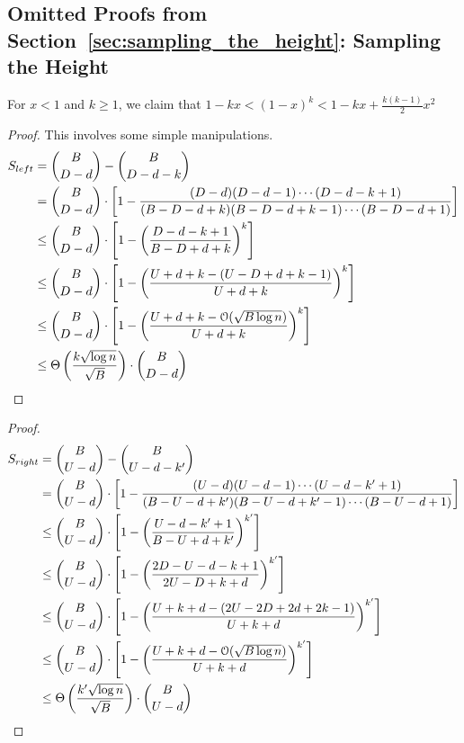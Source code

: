 \subsection{Omitted Proofs from Section~\ref{sec:sampling_the_height}: Sampling the Height}%
\label{sec:appendix_sampling_the_height}
\begin{lemma}
\label{lem:taylor_bound}
For $x < 1$ and $k\ge 1$, we claim that $1-kx < (1-x)^k < 1 - kx + \frac{k(k-1)}{2}x^2$
\end{lemma}


\DLeftBound*
\begin{proof}
This involves some simple manipulations.
\begin{align}
S_{left} &= {{B}\choose{D-d}}-{{B}\choose{D-d-k}}\\
&= {{B}\choose{D-d}}\cdot \left[1-\frac{(D-d)(D-d-1)\cdots(D-d-k+1)}{(B-D-d+k)(B-D-d+k-1)\cdots(B-D-d+1)}\right]\\
&\le {{B}\choose{D-d}}\cdot \left[1-\left(\frac{D-d-k+1}{B-D+d+k}\right)^k\right]\\
&\le {{B}\choose{D-d}}\cdot \left[1-\left(\frac{U+d+k-(U-D+d+k-1)}{U+d+k}\right)^k\right]\\
&\le {{B}\choose{D-d}}\cdot \left[1-\left(\frac{U+d+k-\Bo(\sqrt{B\log n})}{U+d+k}\right)^k\right]\\
&\le \Theta \left( \frac{k\sqrt{\log n}}{\sqrt{B}} \right) \cdot{{B}\choose{D-d}}
\end{align}
\end{proof}

\DRightBound*
\begin{proof}
\begin{align}
S_{right} &= {{B}\choose{U-d}}-{{B}\choose{U-d-k'}}\\
&= {{B}\choose{U-d}}\cdot \left[1-\frac{(U-d)(U-d-1)\cdots(U-d-k'+1)}{(B-U-d+k')(B-U-d+k'-1)\cdots(B-U-d+1)}\right]\\
&\le {{B}\choose{U-d}}\cdot \left[1-\left(\frac{U-d-k'+1}{B-U+d+k'}\right)^{k'}\right]\\
&\le {{B}\choose{U-d}}\cdot \left[1-\left(\frac{2D-U-d-k+1}{2U-D+k+d}\right)^{k'}\right]\\
&\le {{B}\choose{U-d}}\cdot \left[1-\left(\frac{U+k+d - (2U-2D+2d+2k-1)}{U+k+d}\right)^{k'}\right]\\
&\le {{B}\choose{U-d}}\cdot \left[1-\left(\frac{U+k+d - \Bo(\sqrt{B\log n})}{U+k+d}\right)^{k'}\right]\\
&\le \Theta\left(\frac{k'\sqrt{\log n}}{\sqrt{B}}\right)\cdot{{B}\choose{U-d}}
\end{align}
\end{proof}

